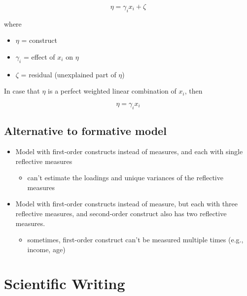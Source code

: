 \documentclass[
]{book}
\providecommand{\tightlist}{%
  \setlength{\itemsep}{0pt}\setlength{\parskip}{0pt}}
\begin{document}
\[
\eta = \gamma_i x_i + \zeta
\]

where

\begin{itemize}
\item
  \(\eta\) = construct
\item
  \(\gamma_i\) = effect of \(x_i\) on \(\eta\)
\item
  \(\zeta\) = residual (unexplained part of \(\eta\))
\end{itemize}

In case that \(\eta\) is a perfect weighted linear combination of \(x_i\), then

\[
\eta = \gamma_i x_i
\]

\hypertarget{alternative-to-formative-model}{%
\section{Alternative to formative model}\label{alternative-to-formative-model}}

\begin{itemize}
\item
  Model with first-order constructs instead of measures, and each with single reflective measures

  \begin{itemize}
  \tightlist
  \item
    can't estimate the loadings and unique variances of the reflective measures
  \end{itemize}
\item
  Model with first-order constructs instead of measure, but each with three reflective measures, and second-order construct also has two reflective measures.

  \begin{itemize}
  \tightlist
  \item
    sometimes, first-order construct can't be measured multiple times (e.g., income, age)
  \end{itemize}
\end{itemize}

\hypertarget{scientific-writing}{%
\chapter{Scientific Writing}\label{scientific-writing}}
\end{document}
